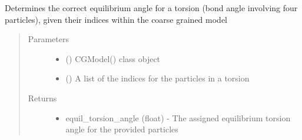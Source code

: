 \documentclass[letterpaper,12pt,english,openany,oneside]{sphinxmanual}
\begin{document}
\begin{fulllineitems}
\begin{fulllineitems}
\begin{quote}
\begin{description}
\begin{itemize}
\end{itemize}


\end{description}\end{quote}

\end{fulllineitems}


\begin{fulllineitems}
\label{\detokenize{cg_model:cg_model.cgmodel.CGModel.get_equil_torsion_angle}}
Determines the correct equilibrium angle for a torsion (bond angle involving four particles), given their indices within the coarse grained model
\begin{quote}\begin{description}
\item[{Parameters}] \leavevmode\begin{itemize}
\item {} 
 () \textendash{} CGModel() class object

\item {} 
 (\sphinxstyleliteralemphasis{\sphinxupquote{( }}\sphinxstyleliteralemphasis{\sphinxupquote{ )}}) \textendash{} A list of the indices for the particles in a torsion

\end{itemize}

\item[{Returns}] \leavevmode
\begin{itemize}
\item {} 
equil\_torsion\_angle (float) - The assigned equilibrium torsion angle for the provided particles

\end{itemize}


\end{description}\end{quote}

\end{fulllineitems}


\end{fulllineitems}
\end{document}
